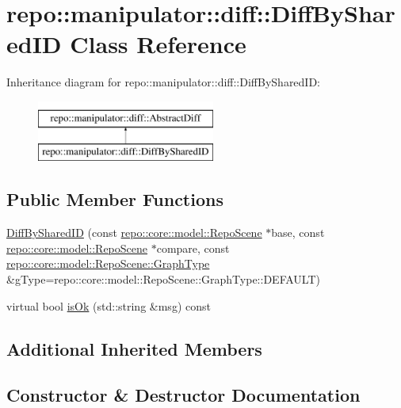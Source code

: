\hypertarget{classrepo_1_1manipulator_1_1diff_1_1_diff_by_shared_i_d}{}\section{repo\+:\+:manipulator\+:\+:diff\+:\+:Diff\+By\+Shared\+I\+D Class Reference}
\label{classrepo_1_1manipulator_1_1diff_1_1_diff_by_shared_i_d}
Inheritance diagram for repo\+:\+:manipulator\+:\+:diff\+:\+:Diff\+By\+Shared\+I\+D\+:\begin{figure}[H]
\begin{center}
\leavevmode
\includegraphics[height=2.000000cm]{classrepo_1_1manipulator_1_1diff_1_1_diff_by_shared_i_d}
\end{center}
\end{figure}
\subsection*{Public Member Functions}
\begin{DoxyCompactItemize}
\item 
\hyperlink{classrepo_1_1manipulator_1_1diff_1_1_diff_by_shared_i_d_a51a13c6d99b27dea1e338951712718b9}{Diff\+By\+Shared\+I\+D} (const \hyperlink{classrepo_1_1core_1_1model_1_1_repo_scene}{repo\+::core\+::model\+::\+Repo\+Scene} $\ast$base, const \hyperlink{classrepo_1_1core_1_1model_1_1_repo_scene}{repo\+::core\+::model\+::\+Repo\+Scene} $\ast$compare, const \hyperlink{classrepo_1_1core_1_1model_1_1_repo_scene_aefcacd6eb4c7774ac1bfe3a6b223337c}{repo\+::core\+::model\+::\+Repo\+Scene\+::\+Graph\+Type} \&g\+Type=repo\+::core\+::model\+::\+Repo\+Scene\+::\+Graph\+Type\+::\+D\+E\+F\+A\+U\+L\+T)
\item 
virtual bool \hyperlink{classrepo_1_1manipulator_1_1diff_1_1_diff_by_shared_i_d_afc3b71c3c85050b703c6ca3412c275e2}{is\+Ok} (std\+::string \&msg) const 
\end{DoxyCompactItemize}
\subsection*{Additional Inherited Members}


\subsection{Constructor \& Destructor Documentation}
\hypertarget{classrepo_1_1manipulator_1_1diff_1_1_diff_by_shared_i_d_a51a13c6d99b27dea1e338951712718b9}{}
